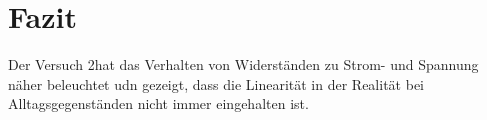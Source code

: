 \documentclass[10pt,a4paper]{article}
\newcommand{\vnr}{2}
\begin{document}
\section{Fazit}
\begin{flushleft}
Der Versuch \vnr hat das Verhalten von Widerständen zu Strom- und Spannung näher beleuchtet udn gezeigt, dass die Linearität in der Realität bei Alltagsgegenständen nicht immer eingehalten ist.
\end{flushleft}

\begingroup
\raggedright
\sloppy
\printbibliography[heading=bibintoc,title={6 \hspace{6pt} Literatur}]
\endgroup
\end{document}
